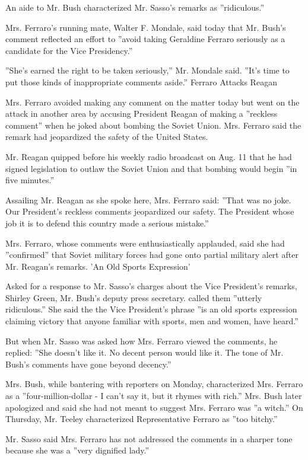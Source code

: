 An aide to Mr. Bush characterized Mr. Sasso's remarks as ''ridiculous.''

Mrs. Ferraro's running mate, Walter F. Mondale, said today that Mr.
Bush's comment reflected an effort to ''avoid taking Geraldine Ferraro
seriously as a candidate for the Vice Presidency.''

''She's earned the right to be taken seriously,'' Mr. Mondale said.
''It's time to put those kinds of inappropriate comments aside.''
Ferraro Attacks Reagan

Mrs. Ferraro avoided making any comment on the matter today but went on
the attack in another area by accusing President Reagan of making a
''reckless comment'' when he joked about bombing the Soviet Union. Mrs.
Ferraro said the remark had jeopardized the safety of the United States.

Mr. Reagan quipped before his weekly radio broadcast on Aug. 11 that he
had signed legislation to outlaw the Soviet Union and that bombing would
begin ''in five minutes.''

Assailing Mr. Reagan as she spoke here, Mrs. Ferraro said: ''That was no
joke. Our President's reckless comments jeopardized our safety. The
President whose job it is to defend this country made a serious
mistake.''

Mrs. Ferraro, whose comments were enthusiastically applauded, said she
had ''confirmed'' that Soviet military forces had gone onto partial
military alert after Mr. Reagan's remarks. 'An Old Sports Expression'

Asked for a response to Mr. Sasso's charges about the Vice President's
remarks, Shirley Green, Mr. Bush's deputy press secretary. called them
''utterly ridiculous.'' She said the the Vice President's phrase ''is an
old sports expression claiming victory that anyone familiar with sports,
men and women, have heard.''

But when Mr. Sasso was asked how Mrs. Ferraro viewed the comments, he
replied: ''She doesn't like it. No decent person would like it. The tone
of Mr. Bush's comments have gone beyond decency.''

Mrs. Bush, while bantering with reporters on Monday, characterized Mrs.
Ferraro as a ''four-million-dollar - I can't say it, but it rhymes with
rich.'' Mrs. Bush later apologized and said she had not meant to suggest
Mrs. Ferraro was ''a witch.'' On Thursday, Mr. Teeley characterized
Representative Ferraro as ''too bitchy.''

Mr. Sasso said Mrs. Ferraro has not addressed the comments in a sharper
tone because she was a ''very dignified lady.''

